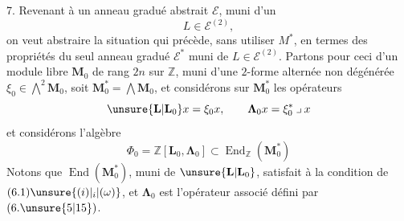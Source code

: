 7. Revenant à un anneau gradué abstrait $\mathcal E$, muni d'un
\[
L\in\mathcal E^{(2)},
\]
on veut abstraire la situation qui précède, sans utiliser $M^*$, en termes des propriétés du seul anneau  gradué $\mathcal E^*$ muni de $L\in\mathcal E^{(2)}$.
Partons pour ceci  d'un module libre $\mathbf M_0$ de rang $2n$ sur $\mathbb Z$, muni d'une $2$-forme alternée non dégénérée  $\xi_0\in\bigwedge^2\mathbf M_0$,  soit \deleted{$\unsure{\xi}$} $\mathbf M_0^*=\bigwedge\mathbf M_0$, et considérons sur $\mathbf M_0^*$ les opérateurs
\[
\unsure{\mathbf L|\mathbf L_0}x=\xi_0x,\qquad\boldsymbol\Lambda_0x=\xi_0^*\mathbin{\lrcorner}x
\]
et considérons l'algèbre
\[
\Phi_0=\mathbb Z[\mathbf L_0,\boldsymbol\Lambda_0]\subset\operatorname{End}_{\mathbb Z}(\mathbf M_0^*)
\]
Notons que $\operatorname{End}(\mathbf M_0^*)$,  muni de $\unsure{\mathbf L|\mathbf L_0}$, satisfait à la condition de $(6.1)\unsure{(i)|_i|(\omega)}$,  et \deleted{$\unsure{\xi}$} $\boldsymbol\Lambda_0$ est l'opérateur associé défini par $(6.\unsure{5|15})$.
